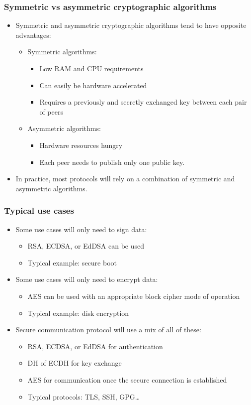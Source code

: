 \begin{frame}
  \frametitle{Symmetric vs asymmetric cryptographic algorithms}
  \begin{itemize}
    \item Symmetric and asymmetric cryptographic algorithms tend to have opposite
      advantages:
      \begin{itemize}
        \item Symmetric algorithms:
          \begin{itemize}
            \item Low RAM and CPU requirements
            \item Can easily be hardware accelerated
            \item Requires a previously and secretly exchanged key between each
              pair of peers
          \end{itemize}
        \item Asymmetric algorithms:
          \begin{itemize}
            \item Hardware resources hungry
            \item Each peer needs to publish only one public key.
          \end{itemize}
      \end{itemize}
    \item In practice, most protocols will rely on a combination of symmetric and
      asymmetric algorithms.
  \end{itemize}
\end{frame}

\begin{frame}
  \frametitle{Typical use cases}
  \begin{itemize}
    \item Some use cases will only need to sign data:
      \begin{itemize}
        \item RSA, ECDSA, or EdDSA can be used
        \item Typical example: secure boot
      \end{itemize}
    \item Some use cases will only need to encrypt data:
      \begin{itemize}
        \item AES can be used with an appropriate block cipher mode of operation
        \item Typical example: disk encryption
      \end{itemize}
    \item Secure communication protocol will use a mix of all of these:
      \begin{itemize}
        \item RSA, ECDSA, or EdDSA for authentication
        \item DH of ECDH for key exchange
        \item AES for communication once the secure connection is established
        \item Typical protocols: TLS, SSH, GPG…
      \end{itemize}
  \end{itemize}
\end{frame}

